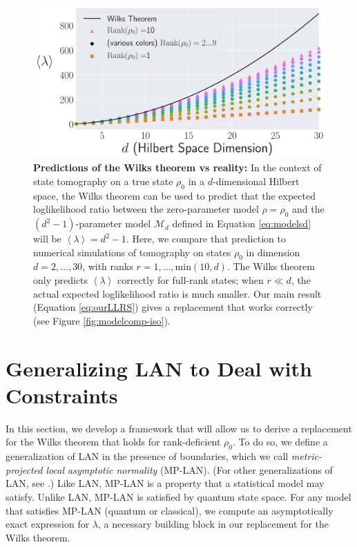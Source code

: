 \documentclass[aps,pra, twocolumn]{revtex4-1}
\newcommand{\expect}[1]{\ensuremath{\left\langle#1\right\rangle}}
\begin{document}
\begin{figure}
\includegraphics[width=\columnwidth]{Images/Figure_2.pdf}
 \caption{\textbf{Predictions of the Wilks theorem vs reality:}  In the context of state tomography on a true state $\rho_0$ in a $d$-dimensional Hilbert space, the Wilks theorem can be used to predict that the expected loglikelihood ratio between the zero-parameter model $\rho = \rho_0$ and the $(d^2-1)$-parameter model $\mathcal{M}_d$ defined in Equation \eqref{eq:modelsd} will be $\expect{\lambda} = d^2-1$.  Here, we compare that prediction to numerical simulations of tomography on states $\rho_0$ in dimension $d=2,\ldots,30$, with ranks $r=1,\ldots,\mathrm{min}(10,d)$.  The Wilks theorem only predicts $\expect{\lambda}$ correctly for full-rank states; when $r \ll d$, the actual expected loglikelihood ratio is much smaller. Our main result (Equation \ref{eq:ourLLRS}) gives a replacement that works correctly (see Figure \ref{fig:modelcomp-iso}).}
\label{fig:boundaries2}
\end{figure}

\section{Generalizing LAN to Deal with Constraints}
\label{sec:lanreplacement}

In this section, we develop a framework that will allow us to derive a replacement for the Wilks theorem that holds for rank-deficient $\rho_{0}$. To do so, we define a generalization of LAN in the presence of boundaries, which we call \emph{metric-projected local asymptotic normality} (MP-LAN). (For other generalizations of LAN, see \cite{Roussas2010, Jeganathan1982}.) Like LAN, MP-LAN is a property that a statistical model may satisfy. Unlike LAN, MP-LAN is satisfied by quantum state space. For any model that satisfies MP-LAN (quantum or classical), we compute an asymptotically exact expression for $\lambda$, a necessary building block in our replacement for the Wilks theorem. 
\end{document}
